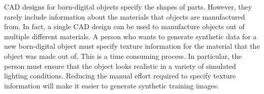 CAD designs for born-digital objects specify the shapes of parts.
However, they rarely include information about the materials that objects are
manufactured from.
In fact, a single CAD design can be used to manufacture objects out of multiple
different materials.
A person who wants to generate synthetic data for a new born-digital object must
specify texture information for the material that the object was made out of.
This is a time consuming process.
In particular, the person must ensure that the object looks realistic in a
variety of simulated lighting conditions.
Reducing the manual effort required to specify texture information will make it
easier to generate synthetic training images.